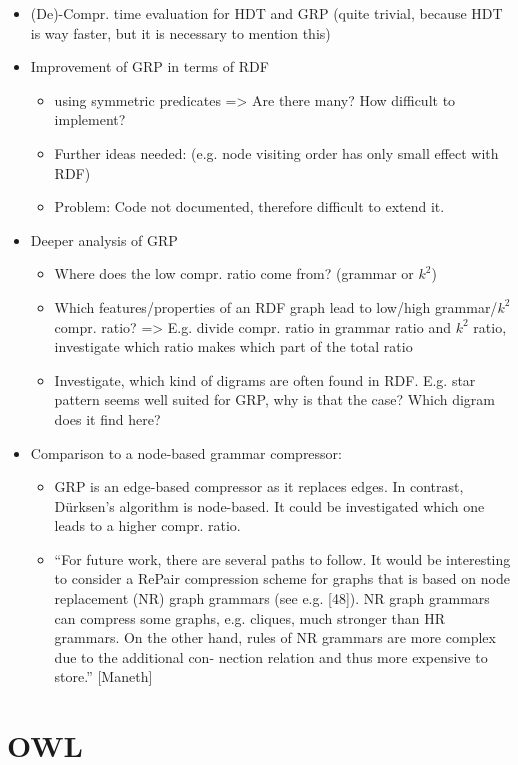 \documentclass[a4paper]{scrartcl}
\begin{document}
\begin{itemize}
	\item (De)-Compr. time evaluation for HDT and GRP (quite trivial, because HDT is way faster, but it is necessary to mention this)
	\item Improvement of GRP in terms of RDF
	\begin{itemize}
		\item using symmetric predicates => Are there many? How difficult to implement?
		\item Further ideas needed: (e.g. node visiting order has only small effect with RDF)
		\item Problem: Code not documented, therefore difficult to extend it.
	\end{itemize}
	\item Deeper analysis of GRP
	\begin{itemize}
		\item Where does the low compr. ratio come from? (grammar or $ k^2 $)
		\item Which features/properties of an RDF graph lead to low/high grammar/$ k^2 $ compr. ratio? => E.g. divide compr. ratio in grammar ratio and $k^2$ ratio, investigate which ratio makes which part of the total ratio
		\item Investigate, which kind of digrams are often found in RDF. E.g. star pattern seems well suited for GRP, why is that the case? Which digram does it find here?
	\end{itemize}
	\item Comparison to a node-based grammar compressor:
	\begin{itemize}
			\item GRP is an edge-based compressor as it replaces edges. In contrast, Dürksen's algorithm is node-based. It could be investigated which one leads to a higher compr. ratio.
			\item \enquote{For future work, there are several paths to follow. It would be interesting to consider a RePair compression scheme for graphs that is based on node replacement (NR) graph grammars (see e.g. [48]). NR graph grammars can compress some graphs, e.g. cliques, much stronger than HR grammars. On the other hand, rules of NR grammars are more complex due to the additional con- nection relation and thus more expensive to store.} [Maneth]
	\end{itemize}
\end{itemize}

\section{OWL}
\end{document}

